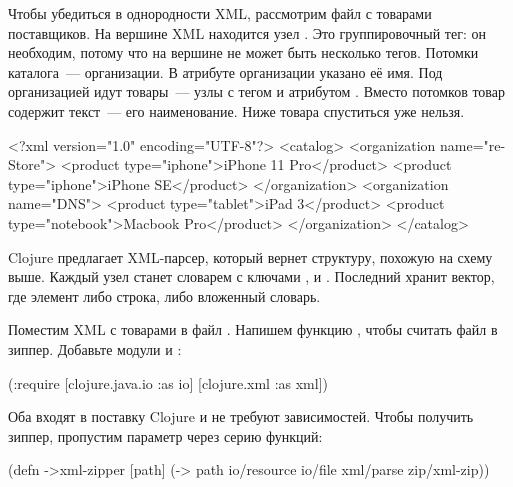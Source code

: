 Чтобы убедиться в однородности XML, рассмотрим файл с товарами поставщиков. На
вершине XML находится узел . Это группировочный тег: он необходим,
потому что на вершине не может быть несколько тегов. Потомки каталога~---
организации. В атрибуте  организации указано её имя. Под организацией
идут товары~--- узлы с тегом  и атрибутом . Вместо
потомков товар содержит текст~--- его наименование. Ниже товара спуститься уже
нельзя.

\begin{english}
  \begin{xml}
<?xml version="1.0" encoding="UTF-8"?>
<catalog>
  <organization name="re-Store">
    <product type="iphone">iPhone 11 Pro</product>
    <product type="iphone">iPhone SE</product>
  </organization>
  <organization name="DNS">
    <product type="tablet">iPad 3</product>
    <product type="notebook">Macbook Pro</product>
  </organization>
</catalog>
  \end{xml}
\end{english}

Clojure предлагает XML-парсер, который вернет структуру, похожую на схему
 выше. Каждый узел станет словарем с ключами
,  и . Последний хранит вектор, где
элемент либо строка, либо вложенный словарь.

Поместим XML с товарами в файл . Напишем функцию
, чтобы считать файл в зиппер. Добавьте модули  и
:

\begin{english}
  \begin{clojure}
(:require
 [clojure.java.io :as io]
 [clojure.xml :as xml])
  \end{clojure}
\end{english}

Оба входят в поставку Clojure и не требуют зависимостей. Чтобы получить зиппер,
пропустим параметр  через серию функций:


\begin{english}
  \begin{clojure}
(defn ->xml-zipper [path]
  (-> path
      io/resource
      io/file
      xml/parse
      zip/xml-zip))
  \end{clojure}
\end{english}

